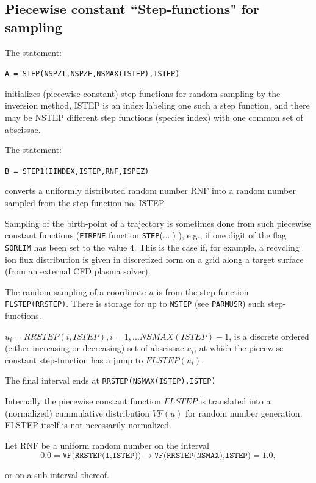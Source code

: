 \subsection{Piecewise constant ``Step-functions" for sampling}
\label{sec2.7.1}
The statement:

\texttt{A = STEP(NSPZI,NSPZE,NSMAX(ISTEP),ISTEP)}

initializes (piecewise constant) step functions for random sampling by the inversion method,
ISTEP is an index labeling one such a step function, and there may be NSTEP different step functions (species index)
with one common set of abscissae.

The statement:

\texttt{B = STEP1(IINDEX,ISTEP,RNF,ISPEZ)}

converts a uniformly distributed random number RNF into a random number sampled
from the step function  no. ISTEP.

\medskip

Sampling of the birth-point of a trajectory is sometimes done from such
piecewise constant functions (\texttt{EIRENE} function \texttt{STEP}(....) ), e.g.,
if one digit of the flag \texttt{SORLIM} has been set to the value 4.
This is the case if, for example, a recycling ion flux distribution is given
in discretized form on a grid along a target surface (from an external CFD plasma solver).

The
random sampling of a coordinate $u$ is from the step-function
\texttt{FLSTEP(RRSTEP)}. There is storage for up to \texttt{NSTEP} (see \texttt{PARMUSR})
such step-functions.

$u_i = RRSTEP(i,ISTEP), i=1,...NSMAX(ISTEP)-1$, is a discrete ordered (either increasing or decreasing) set of
abscissae $u_i$, at which the piecewise constant step-function has
a jump to $FLSTEP(u_i)$.

The final interval ends at \texttt{RRSTEP(NSMAX(ISTEP),ISTEP)}

Internally the piecewise constant function $FLSTEP$ is translated into a (normalized) cummulative
distribution $VF(u)$ for random number generation. FLSTEP itself is not necessarily normalized.


Let RNF be a uniform random number on the interval
\begin{equation}\nonumber
0.0 =\texttt{VF(RRSTEP(1,ISTEP))} \rightarrow \texttt{VF(RRSTEP(NSMAX),ISTEP)} = 1.0,
\end{equation}

or on a sub-interval thereof.

